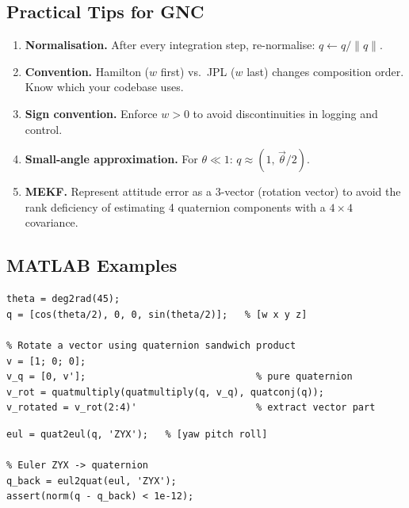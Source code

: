\documentclass[12pt,a4paper]{article}
\begin{document}
\subsection{Practical Tips for GNC}

\begin{enumerate}
  \item \textbf{Normalisation.} After every integration step, re-normalise:
        $q \leftarrow q/\|q\|$.
  \item \textbf{Convention.} Hamilton ($w$ first) vs.\ JPL ($w$ last) changes
        composition order. Know which your codebase uses.
  \item \textbf{Sign convention.} Enforce $w>0$ to avoid discontinuities in
        logging and control.
  \item \textbf{Small-angle approximation.}
        For $\theta \ll 1$: $q \approx (1,\,\vec{\theta}/2)$.
  \item \textbf{MEKF.} Represent attitude error as a 3-vector (rotation
        vector) to avoid the rank deficiency of estimating 4 quaternion
        components with a $4\times4$ covariance.
\end{enumerate}

\subsection{MATLAB Examples}

\begin{lstlisting}[style=matlab, caption={Quaternion rotation of a vector.}]
% Define a unit quaternion: 45-deg rotation about Z
theta = deg2rad(45);
q = [cos(theta/2), 0, 0, sin(theta/2)];   % [w x y z]

% Rotate a vector using quaternion sandwich product
v = [1; 0; 0];
v_q = [0, v'];                              % pure quaternion
v_rot = quatmultiply(quatmultiply(q, v_q), quatconj(q));
v_rotated = v_rot(2:4)'                     % extract vector part
\end{lstlisting}

\begin{lstlisting}[style=matlab, caption={Quaternion to Euler (ZYX) and back.}]
% quaternion -> Euler ZYX
eul = quat2eul(q, 'ZYX');   % [yaw pitch roll]

% Euler ZYX -> quaternion
q_back = eul2quat(eul, 'ZYX');
assert(norm(q - q_back) < 1e-12);
\end{lstlisting}
\end{document}
